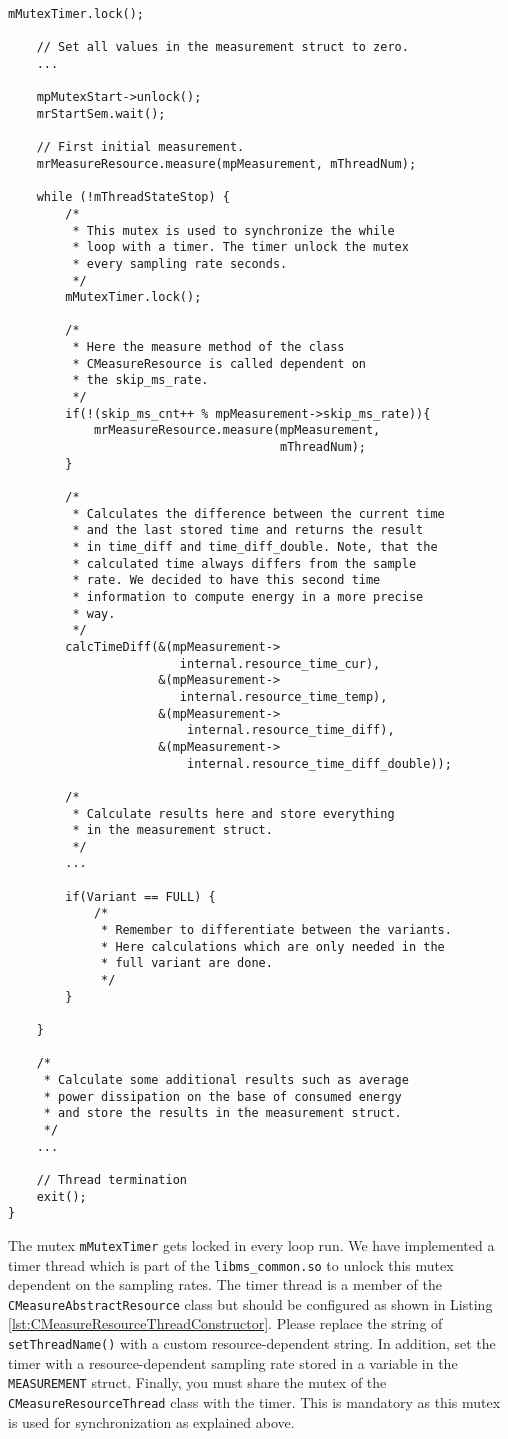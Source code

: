 \begin{description}
\begin{lstlisting}[caption={Scheme of the \texttt{run()} method that each \texttt{CMeasureResourceThread} must have. \added[id=ck]{Listing aktualisiert}}, label=lst:RunMethodScheme]
	mMutexTimer.lock();
	
	// Set all values in the measurement struct to zero.
	...
	
	mpMutexStart->unlock();
	mrStartSem.wait();
	
	// First initial measurement. 
	mrMeasureResource.measure(mpMeasurement, mThreadNum);
	
	while (!mThreadStateStop) {
		/*
		 * This mutex is used to synchronize the while
		 * loop with a timer. The timer unlock the mutex
		 * every sampling rate seconds.
		 */
		mMutexTimer.lock();
		
		/*
		 * Here the measure method of the class
		 * CMeasureResource is called dependent on
		 * the skip_ms_rate.
		 */
		if(!(skip_ms_cnt++ % mpMeasurement->skip_ms_rate)){
			mrMeasureResource.measure(mpMeasurement,
									  mThreadNum);
		}
		
		/*
		 * Calculates the difference between the current time
		 * and the last stored time and returns the result
		 * in time_diff and time_diff_double. Note, that the
		 * calculated time always differs from the sample
		 * rate. We decided to have this second time
		 * information to compute energy in a more precise
		 * way.
		 */
		calcTimeDiff(&(mpMeasurement->
				       	internal.resource_time_cur),
					 &(mpMeasurement->
					 	internal.resource_time_temp),
					 &(mpMeasurement->
						 internal.resource_time_diff),
					 &(mpMeasurement->
						 internal.resource_time_diff_double));
			
		/* 
		 * Calculate results here and store everything
		 * in the measurement struct.
		 */
		...
		
		if(Variant == FULL) {
			/*
			 * Remember to differentiate between the variants.
			 * Here calculations which are only needed in the
			 * full variant are done.
			 */
		}
		
	}
	
	/* 
	 * Calculate some additional results such as average
	 * power dissipation on the base of consumed energy
	 * and store the results in the measurement struct.
	 */
	...
	
	// Thread termination
	exit();
}	
\end{lstlisting}
	The mutex \texttt{mMutexTimer} gets locked in every loop run. We have implemented a timer thread which is part of the \texttt{libms\_common.so} to unlock this mutex dependent on the sampling rates. The timer thread is a member of the \texttt{CMeasureAbstractResource} class but should be configured as shown in Listing \ref{lst:CMeasureResourceThreadConstructor}. Please replace the string of \texttt{setThreadName()} with a custom resource-dependent string. In addition, set the timer with a resource-dependent sampling rate stored in a variable in the \texttt{MEASUREMENT} struct. Finally, you must share the mutex of the \texttt{CMeasureResourceThread} class with the timer. This is mandatory as this mutex is used for synchronization as explained above.


\end{description}
